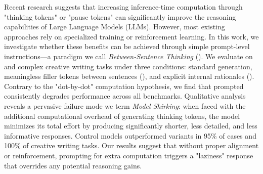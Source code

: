 Recent research suggests that increasing inference-time computation through "thinking tokens" or "pause tokens" can significantly improve the reasoning capabilities of Large Language Models (LLMs). However, most existing approaches rely on specialized training or reinforcement learning. In this work, we investigate whether these benefits can be achieved through simple prompt-level instructions—a paradigm we call \textit{Between-Sentence Thinking} (\bst). We evaluate \gpt on \tqa and complex creative writing tasks under three conditions: standard generation, meaningless filler tokens between sentences (\bstfiller), and explicit internal rationales (\bstrationale). Contrary to the "dot-by-dot" computation hypothesis, we find that prompted \bst consistently degrades performance across all benchmarks. Qualitative analysis reveals a pervasive failure mode we term \textit{Model Shirking}: when faced with the additional computational overhead of generating thinking tokens, the model minimizes its total effort by producing significantly shorter, less detailed, and less informative responses. Control models outperformed \bst variants in 95\% of \tqa cases and 100\% of creative writing tasks. Our results suggest that without proper alignment or reinforcement, prompting for extra computation triggers a "laziness" response that overrides any potential reasoning gains.